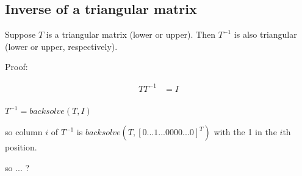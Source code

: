 \documentclass[english]{article}
\begin{document}
\subsection*{Inverse of a triangular matrix}

Suppose $T$ is a triangular matrix (lower or upper). Then $T^{-1}$ is also triangular (lower or upper, respectively).

Proof:


\begin{align*}
T T^{-1} &= I \\
\end{align*}


$T^{-1} = backsolve(T, I)$

so column $i$ of $T^{-1}$ is
 $backsolve(T, [0 ... 1 ... 0 0 0 0 ... 0]^T) $
 with the 1 in the $i$th position.

so ... ?
\end{document}
